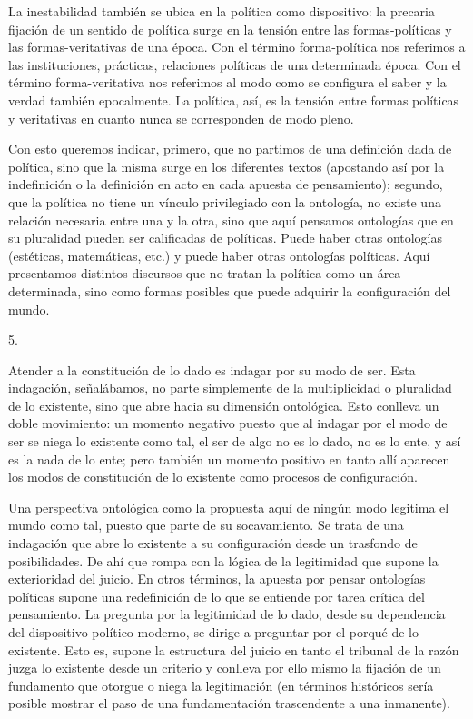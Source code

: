 La inestabilidad también se ubica en la política como dispositivo: la precaria fijación de un sentido de política surge en la tensión entre las formas-políticas y las formas-veritativas de una época. Con el término forma-política nos referimos a las instituciones, prácticas, relaciones políticas de una determinada época. Con el término forma-veritativa nos referimos al modo como se configura el saber y la verdad también epocalmente. La política, así, es la tensión entre formas políticas y veritativas en cuanto nunca se corresponden de modo pleno.

Con esto queremos indicar, primero, que no partimos de una definición dada de política, sino que la misma surge en los diferentes textos (apostando así por la indefinición o la definición en acto en cada apuesta de pensamiento); segundo, que la política no tiene un vínculo privilegiado con la ontología, no existe una relación necesaria entre una y la otra, sino que aquí pensamos ontologías que en su pluralidad pueden ser calificadas de políticas. Puede haber otras ontologías (estéticas, matemáticas, etc.) y puede haber otras ontologías políticas. Aquí presentamos distintos discursos que no tratan la política como un área determinada, sino como formas posibles que puede adquirir la configuración del mundo.

5.

Atender a la constitución de lo dado es indagar por su modo de ser. Esta indagación, señalábamos, no parte simplemente de la multiplicidad o pluralidad de lo existente, sino que abre hacia su dimensión ontológica. Esto conlleva un doble movimiento: un momento negativo puesto que al indagar por el modo de ser se niega lo existente como tal, el ser de algo no es lo dado, no es lo ente, y así es la nada de lo ente; pero también un momento positivo en tanto allí aparecen los modos de constitución de lo existente como procesos de configuración.

Una perspectiva ontológica como la propuesta aquí de ningún modo legitima el mundo como tal, puesto que parte de su socavamiento. Se trata de una indagación que abre lo existente a su configuración desde un trasfondo de posibilidades. De ahí que rompa con la lógica de la legitimidad que supone la exterioridad del juicio. En otros términos, la apuesta por pensar ontologías políticas supone una redefinición de lo que se entiende por tarea crítica del pensamiento. La pregunta por la legitimidad de lo dado, desde su dependencia del dispositivo político moderno, se dirige a preguntar por el porqué de lo existente. Esto es, supone la estructura del juicio en tanto el tribunal de la razón juzga lo existente desde un criterio y conlleva por ello mismo la fijación de un fundamento que otorgue o niega la legitimación (en términos históricos sería posible mostrar el paso de una fundamentación trascendente a una inmanente).

